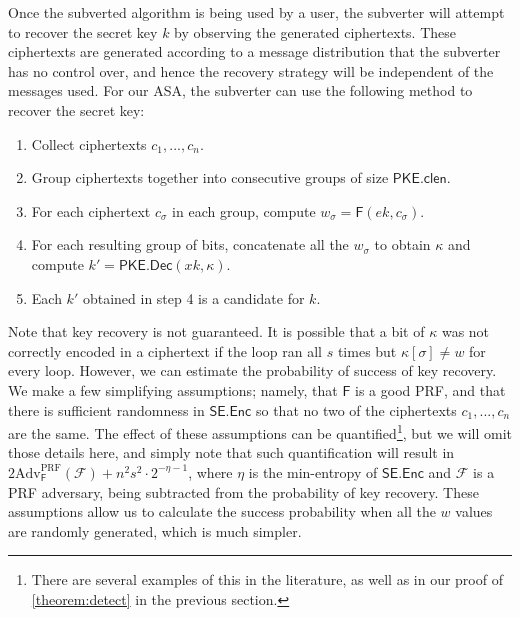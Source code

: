Once the subverted algorithm is being used by a user, the subverter will attempt to recover the secret key $k$ by observing the generated ciphertexts. These ciphertexts are generated according to a message distribution that the subverter has no control over, and hence the recovery strategy will be independent of the messages used. For our ASA, the subverter can use the following method to recover the secret key:
\begin{enumerate}\itemsep0em
\item Collect ciphertexts $c_1,...,c_n$.
\item Group ciphertexts together into consecutive groups of size $\mathsf{PKE.clen}$.
\item For each ciphertext $c_\sigma$ in each group, compute $w_\sigma = \mathsf{F}(ek, c_\sigma)$.
\item For each resulting group of bits, concatenate all the $w_\sigma$ to obtain $\kappa$ and compute $k'=\mathsf{PKE.Dec}(xk,\kappa)$.
\item Each $k'$ obtained in step 4 is a candidate for $k$.
\end{enumerate}

Note that key recovery is not guaranteed. It is possible that a bit of $\kappa$ was not correctly encoded in a ciphertext if the loop ran all $s$ times but $\kappa[\sigma]\neq w$ for every loop. However, we can estimate the probability of success of key recovery. We make a few simplifying assumptions; namely, that $\mathsf{F}$ is a good PRF, and that there is sufficient randomness in $\mathsf{SE.Enc}$ so that no two of the ciphertexts $c_1,...,c_n$ are the same. The effect of these assumptions can be quantified\footnote{There are several examples of this in the literature, as well as in our proof of \autoref{theorem:detect} in the previous section.}, but we will omit those details here, and simply note that such quantification will result in $2\text{Adv}^{\mathrm{PRF}}_\mathsf{F}(\mathcal{F})+n^2s^2\cdot 2^{-\eta-1}$, where $\eta$ is the min-entropy of $\mathsf{SE.Enc}$ and $\mathcal{F}$ is a PRF adversary, being subtracted from the probability of key recovery. These assumptions allow us to calculate the success probability when all the $w$ values are randomly generated, which is much simpler.

